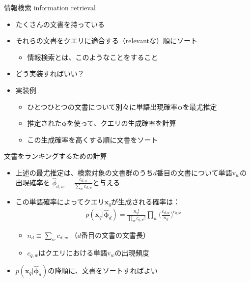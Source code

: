 \documentclass[aspectratio=169,unicode,dvipdfmx,14pt]{beamer}
\begin{document}
\begin{frame}{情報検索 information retrieval}
\begin{itemize}
\item たくさんの文書を持っている
\item それらの文書をクエリに適合する（relevantな）順にソート
\begin{itemize}
\item 情報検索とは、このようなことをすること
\end{itemize}
\item どう実装すればいい？
\item 実装例
\begin{itemize}
\item ひとつひとつの文書について別々に単語出現確率$\bm{\phi}$を最尤推定
\item 推定された$\bm{\phi}$を使って、クエリの生成確率を計算
\item この生成確率を高くする順に文書をソート
\end{itemize}
\end{itemize}
\end{frame}

\begin{frame}{文書をランキングするための計算}
\begin{itemize}
\item 上述の最尤推定は、検索対象の文書群のうち$d$番目の文書について単語$\mbox{v}_w$の出現確率を
$\hat{\phi}_{d,w} = \frac{c_{d,w}}{\sum_w c_{d,w}}$と与える
\item この単語確率によってクエリ$\bm{x}_q$が生成される確率は：
\begin{align}
p(\bm{x}_q | \hat{\bm{\phi}}_d) = \frac{n_q!}{\prod_w c_{q,w}!} \prod_w \bigg( \frac{c_{d,w}}{n_d} \bigg)^{c_{q,w}}
\end{align}
\begin{itemize}
\item $n_d \equiv \sum_w c_{d,w}$ （$d$番目の文書の文書長）
\item $c_{q,w}$はクエリにおける単語$\mbox{v}_w$の出現頻度
\end{itemize}
\item $p(\bm{x}_q | \hat{\bm{\phi}}_d)$の降順に、文書をソートすればよい
\end{itemize}
\end{frame}
\end{document}
